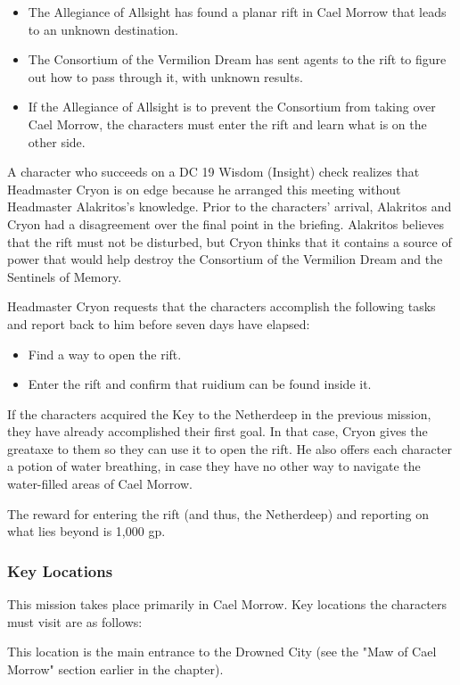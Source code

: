 \documentclass[10pt,a4paper,twoside,bg=print,twocolumn,openany,nodeprecatedcode]{dndbook}
\begin{document}
\begin{itemize}
\item The Allegiance of Allsight has found a planar rift in Cael Morrow that leads to an unknown destination.
\item The Consortium of the Vermilion Dream has sent agents to the rift to figure out how to pass through it, with unknown results.
\item If the Allegiance of Allsight is to prevent the Consortium from taking over Cael Morrow, the characters must enter the rift and learn what is on the other side.
\end{itemize}

A character who succeeds on a DC 19 Wisdom (Insight) check realizes that Headmaster Cryon is on edge because he arranged this meeting without Headmaster Alakritos's knowledge. Prior to the characters' arrival, Alakritos and Cryon had a disagreement over the final point in the briefing. Alakritos believes that the rift must not be disturbed, but Cryon thinks that it contains a source of power that would help destroy the Consortium of the Vermilion Dream and the Sentinels of Memory.

Headmaster Cryon requests that the characters accomplish the following tasks and report back to him before seven days have elapsed:


\begin{itemize}
\item Find a way to open the rift.
\item Enter the rift and confirm that ruidium can be found inside it.
\end{itemize}

If the characters acquired the Key to the Netherdeep in the previous mission, they have already accomplished their first goal. In that case, Cryon gives the greataxe to them so they can use it to open the rift. He also offers each character a potion of water breathing, in case they have no other way to navigate the water-filled areas of Cael Morrow.

The reward for entering the rift (and thus, the Netherdeep) and reporting on what lies beyond is 1,000 gp.

\subsubsection{Key Locations}
This mission takes place primarily in Cael Morrow. Key locations the characters must visit are as follows:


\begin{description}[nolistsep]
\item[Maw of Cael Morrow.]
This location is the main entrance to the Drowned City (see the "Maw of Cael Morrow" section earlier in the chapter).
\end{description}
\end{document}
